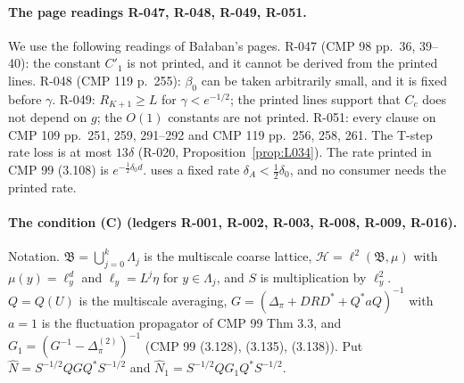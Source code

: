\paragraph{The page readings R-047, R-048, R-049, R-051.}
\begin{remark}\label{src:BOOKKEEPING}
We use the following readings of Ba{\l}aban's pages.
R-047 (CMP 98 pp.~36, 39--40): the constant $C'_1$ is not printed, and it cannot be derived from the printed lines.
R-048 (CMP 119 p.~255): $\beta_0$ can be taken arbitrarily small, and it is fixed before $\gamma$.
R-049: $R_{K+1}\ge L$ for $\gamma<e^{-1/2}$; the printed lines support that $C_c$ does not depend on $g$; the $O(1)$ constants are not printed.
R-051: every clause on CMP 109 pp.~251, 259, 291--292 and CMP 119 pp.~256, 258, 261.
The T-step rate loss is at most $13\delta$ (R-020, Proposition~\ref{prop:L034}). The rate printed in CMP 99 (3.108) is $e^{-\frac12\delta_0d}$.  uses a fixed rate $\delta_A<\frac12\delta_0$, and no consumer needs the printed rate.
\end{remark}

\paragraph{The condition (C) (ledgers R-001, R-002, R-003, R-008, R-009, R-016).}
Notation. $\mathfrak B=\bigcup_{j=0}^k\Lambda_j$ is the multiscale coarse lattice, $\mathcal H=\ell^2(\mathfrak B,\mu)$ with $\mu(y)=\ell_y^d$ and $\ell_y=L^j\eta$ for $y\in\Lambda_j$, and $S$ is multiplication by $\ell_y^2$. $Q=Q(U)$ is the multiscale averaging, $G=(\Delta_\pi+DRD^*+Q^*aQ)^{-1}$ with $a=1$ is the fluctuation propagator of CMP 99 Thm 3.3, and $G_1=(G^{-1}-\Delta_\pi^{(2)})^{-1}$ (CMP 99 (3.128), (3.135), (3.138)). Put $\hat N=S^{-1/2}QGQ^*S^{-1/2}$ and $\hat N_1=S^{-1/2}QG_1Q^*S^{-1/2}$.

